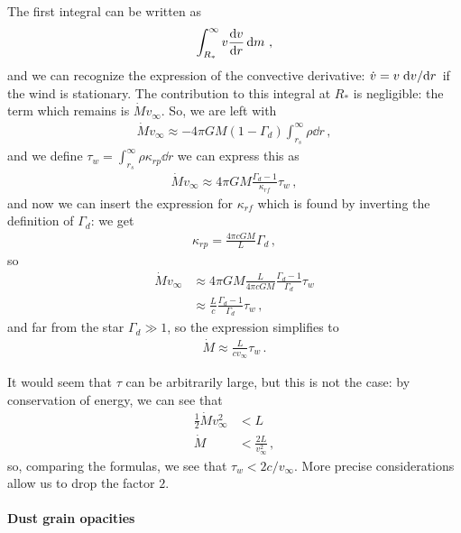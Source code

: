 \documentclass[main.tex]{subfiles}
\begin{document}
\begin{bluebox}
The first integral can be written as 
%
\begin{align}
\int_{R_*}^{ \infty } v \dv{v}{r} \dd{m}
\,,
\end{align}
%
and we can recognize the expression of the convective derivative: \(\dot{v}  = v \dv*{v}{r}\) if the wind is stationary. The contribution to this integral at \(R_*\) is negligible: the term which remains is \(\dot{M} v_{ \infty }\). So, we are left with 
%
\begin{align}
\dot{M} v_{ \infty } \approx - 4 \pi  GM (1- \Gamma_{d}) \int_{r_s}^{ \infty }
\rho \dd{r}
\,,
\end{align}
%
and we define \(\tau_{w} = \int_{r_s}^{ \infty } \rho \kappa_{rp} \dd{r}\) we can express this as 
%
\begin{align}
\dot{M} v_{ \infty } \approx 4 \pi GM \frac{\Gamma_{d} -1 }{\kappa_{rf}} \tau_{w}
\,,
\end{align}
%
and now we can insert the expression for \(\kappa_{rf}\) which is found by inverting the definition of \(\Gamma_{d}\): we get 
%
\begin{align}
\kappa_{rp} = \frac{4 \pi c GM }{L} \Gamma_{d}
\,,
\end{align}
%
so 
%
\begin{align}
\dot{M} v_{ \infty } &\approx 4 \pi  GM \frac{L}{4 \pi c GM} \frac{\Gamma_{d} - 1}{\Gamma_{d}} \tau_{w}  \\
&\approx \frac{L}{c} \frac{\Gamma_{d} - 1}{\Gamma_{d}} \tau_{w}
\,,
\end{align}
%
and far from the star \(\Gamma_{d} \gg 1\), so the expression simplifies to 
%
\begin{align}
\dot{M} \approx \frac{L}{c v_{ \infty }}\tau_{w}
\,.
\end{align}

It would seem that \(\tau \) can be arbitrarily large, but this is not the case: by conservation of energy, we can see that 
%
\begin{align}
\frac{1}{2} \dot{M} v_{ \infty }^2 &< L  \\
\dot{M} &< \frac{2L}{v_{ \infty }^2}
\,,
\end{align}
%
so, comparing the formulas, we see that \(\tau_{w} < 2 c / v_{ \infty }\). 
More precise considerations allow us to drop the factor \(2\). 
\end{bluebox}

\paragraph{Dust grain opacities}
\end{document}
